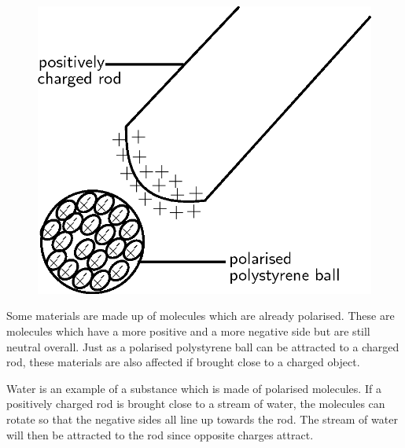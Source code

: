 	\begin{figure}[H] %
    \begin{center}
    \label{m38780*id201917!!!underscore!!!media}\label{m38780*id201917!!!underscore!!!printimage}\includegraphics{col11305.imgs/m38780_PG10C8_011.png} %
        
      \vspace{2pt}
    \vspace{.1in}
    
    \end{center}

 \end{figure}   

    \addtocounter{footnote}{-0}
    
        \par 
        \label{m38780*id201923}Some materials are made up of molecules which are already polarised.
These are molecules which have
a more positive and a more negative side but are still neutral overall.
Just as a polarised polystyrene ball can be attracted to a charged rod, these materials
are also affected if brought close to a charged object.\par 
        \label{m38780*id201929}Water is an example of a substance which is made of polarised molecules.
If a positively charged rod is brought close to a stream of water, the molecules can rotate
so that the negative sides all line up towards the rod.
The stream of water will then be attracted to the rod since opposite charges attract.\par 
      
